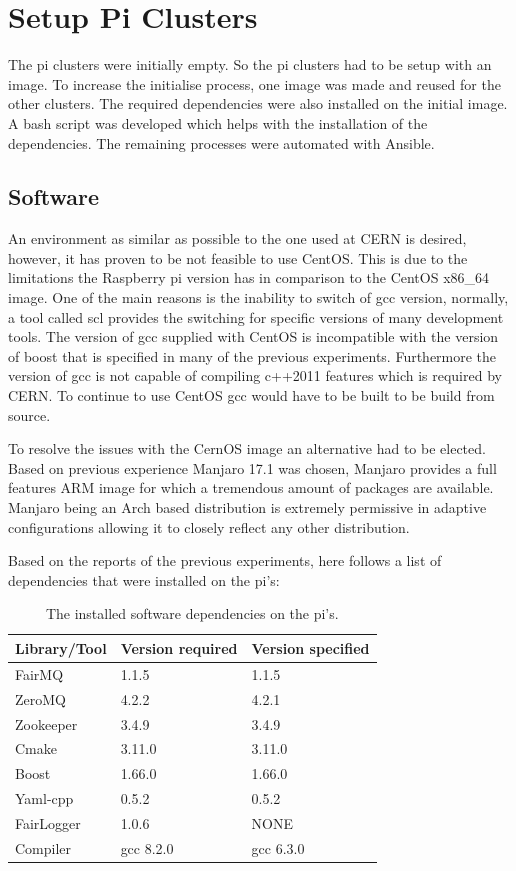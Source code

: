 \documentclass[]{article}
\begin{document}
\section{Setup Pi Clusters}

The pi clusters were initially empty. So the pi clusters had to be setup with an image. To increase the initialise process, one image was made and reused for the other clusters. The required dependencies were also installed on the initial image. A bash script was developed which helps with the installation of the dependencies. The remaining processes were automated with Ansible.

\subsection{Software}
An environment as similar as possible to the one used at CERN is desired, however, it has proven to be not feasible to use CentOS. This is due to the limitations the Raspberry pi version has in comparison to the CentOS x86\_64 image. One of the main reasons is the inability to switch of gcc version, normally, a tool called scl provides the switching for specific versions of many development tools. The version of gcc supplied with CentOS is incompatible with the version of boost that is specified in many of the previous experiments. Furthermore the version of gcc is not capable of compiling c++2011 features which is required by CERN. To continue to use CentOS gcc would have to be built to be build from source.

To resolve the issues with the CernOS image an alternative had to be elected. Based on previous experience Manjaro 17.1 was chosen, Manjaro provides a full features ARM image for which a tremendous amount of packages are available. Manjaro being an Arch based distribution is extremely permissive in adaptive configurations allowing it to closely reflect any other distribution.

Based on the reports of the previous experiments, here follows a list of dependencies that were installed on the pi’s:

\begin{table}[H]
	\begin{center}
		\begin{tabular}{ | l | l | l |}
			\hline
			Library/Tool & Version required & Version specified \\ \hline
			FairMQ & 1.1.5 & 1.1.5 \\ \hline
			ZeroMQ & 4.2.2 & 4.2.1 \\ \hline
			Zookeeper & 3.4.9 & 3.4.9 \\ \hline
			Cmake & 3.11.0 & 3.11.0 \\ \hline
			Boost & 1.66.0 & 1.66.0 \\ \hline
			Yaml-cpp & 0.5.2 & 0.5.2 \\ \hline
			FairLogger & 1.0.6 & NONE \\ \hline
			Compiler & gcc 8.2.0 & gcc 6.3.0 \\
			\hline
		\end{tabular}
		\caption{The installed software dependencies on the pi’s.}
		\label{tab:librabies}
	\end{center}
\end{table}
\end{document}
